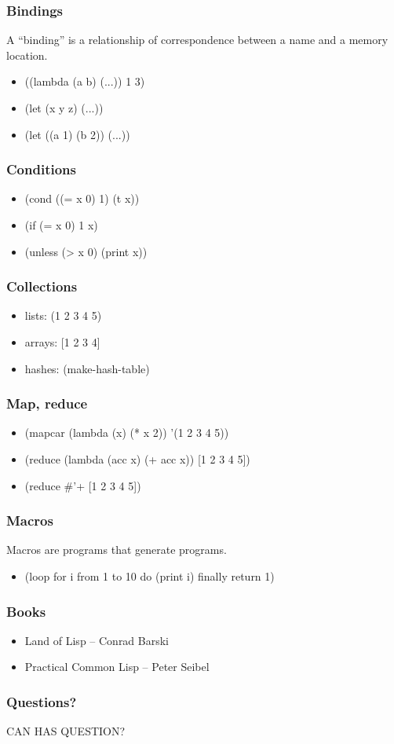 \documentclass[16pt]{beamer}
\begin{document}
\begin{frame}
  \frametitle{Bindings}
  \begin{block}{}
  A ``binding'' is a relationship of
  correspondence between a name and a memory location.
  \end{block}
  \begin{itemize}
  \item ((lambda (a b) (...)) 1 3)
  \item (let (x y z) (...))
  \item (let ((a 1) (b 2)) (...))
  \end{itemize}
\end{frame}

\begin{frame}
  \frametitle{Conditions}
  \begin{itemize}
  \item (cond ((= x 0) 1) (t x))
  \item (if (= x 0) 1 x)
  \item (unless (> x 0) (print x))
  \end{itemize}
\end{frame}

\begin{frame}
  \frametitle{Collections}
  \begin{itemize}
  \item lists: (1 2 3 4 5)
  \item arrays: [1 2 3 4]
  \item hashes: (make-hash-table)
  \end{itemize}
\end{frame}

\begin{frame}
  \frametitle{Map, reduce}
  \begin{itemize}
  \item (mapcar (lambda (x) (* x 2)) '(1 2 3 4 5))
  \item (reduce (lambda (acc x) (+ acc x)) [1 2 3 4 5])
  \item (reduce #'+ [1 2 3 4 5])
  \end{itemize}
\end{frame}

\begin{frame}
  \frametitle{Macros}
  \begin{block}{}
  Macros are programs that generate programs.
  \end{block}
  \begin{itemize}
  \item (loop for i from 1 to 10 do (print i) finally return 1)
  \end{itemize}
\end{frame}

\begin{frame}
  \frametitle{Books}
  \begin{itemize}
  \item Land of Lisp -- Conrad Barski
  \item Practical Common Lisp -- Peter Seibel
  \end{itemize}
\end{frame}

\begin{frame}
  \frametitle{Questions?}
  \begin{center}
  CAN HAS QUESTION?
  \end{center}
\end{frame}
\end{document}
